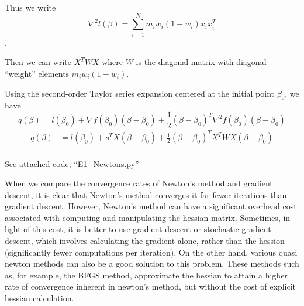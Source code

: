 \documentclass[12pt]{article}
\newenvironment{problem}[2][Exercise]{\begin{trivlist}
\item[\hskip \labelsep {\bfseries #1}\hskip \labelsep {\bfseries #2.}]}{\end{trivlist}}
\begin{document}
\begin{problem}{C}
Thus we write $$\nabla^2 l (\beta) = \sum_{i=1}^N m_iw_i(1-w_i)x_ix_i^T$$.

Then we can write $X^T W X$ where $W$ is the diagonal matrix with diagonal ``weight'' elements $m_iw_i(1-w_i)$.


Using the second-order Taylor series expansion centered at the initial point $\beta_0$, we have
$$q(\beta) = l(\beta_0) + \nabla f(\beta_0)(\beta - \beta_0) + \frac{1}{2} (\beta - \beta_0)^T \nabla^2 f(\beta_0)(\beta - \beta_0)$$
\begin{align*}
q(\beta) &= l(\beta_0) + s^TX(\beta - \beta_0) + \frac{1}{2}(\beta - \beta_0)^T X^TWX (\beta - \beta_0)\\
\end{align*}
\end{problem}

\begin{problem}{D}
See attached code, ``E1\_Newtons.py''
\end{problem}

\begin{problem}{E}
When we compare the convergence rates of Newton's method and  gradient descent, it is clear that Newton's method converges it far fewer iterations than gradient descent.
However, Newton's method can have a significant overhead cost associated with computing and manipulating the hessian matrix.
Sometimes, in light of this cost, it is better to use gradient descent or stochastic gradient descent, which involves calculating the gradient alone, rather than the hession (significantly fewer computations per iteration).
On the other hand, various quasi newton methods can also be a good solution to this problem.
These methods such as, for example, the BFGS method, approximate the hessian to attain a higher rate of convergence inherent in newton's method, but without the cost of explicit hessian calculation.
\end{problem}
\end{document}
